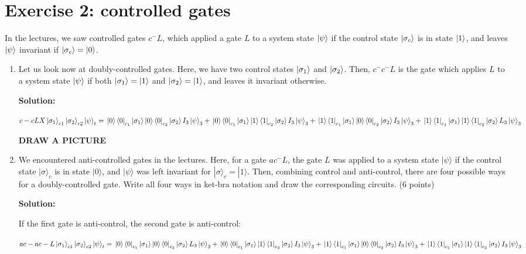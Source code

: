 \documentclass[12pt]{article}
\begin{document}
\section{Exercise 2: controlled gates}
In the lectures, we saw controlled gates $c^{-}L$, which applied a gate $L$ to a system state $\ket{\psi}$ if the control state $\ket{\sigma_c}$ is in state $\ket{1}$, and leaves $\ket{\psi}$ invariant if $\ket{\sigma_c} = \ket{0}$.
\begin{enumerate}
    \item Let us look now at doubly-controlled gates. Here, we have two control states $\ket{\sigma_1}$ and $\ket{\sigma_2}$. Then, $c^{-}c^{-}L$ is the gate which applies $L$ to a system state $\ket{\psi}$ if both $\ket{\sigma_1}=\ket{1}$ and $\ket{\sigma_2}=\ket{1}$, and leaves it invariant otherwise.


          \textbf{Solution:}


          $
              c-cLX\ket{\sigma_1}_{c1}\ket{\sigma_2}_{c2}\ket{\psi}_t=
              \\\ket{0}\bra{0}_{c_1}\ket{\sigma_1}\ket{0}\bra{0}_{c_2}\ket{\sigma_2}I_3\ket{\psi}_3+
              \\\ket{0}\bra{0}_{c_1}\ket{\sigma_1}\ket{1}\bra{1}_{c_2}\ket{\sigma_2}I_3\ket{\psi}_3+
              \\\ket{1}\bra{1}_{c_1}\ket{\sigma_1}\ket{0}\bra{0}_{c_2}\ket{\sigma_2}I_3\ket{\psi}_3+
              \\\ket{1}\bra{1}_{c_1}\ket{\sigma_1}\ket{1}\bra{1}_{c_2}\ket{\sigma_2}L_3\ket{\psi}_3
          $


          \textbf{DRAW A PICTURE}

    \item We encountered anti-controlled gates in the lectures. Here, for a gate $ac^{-}L$, the gate $L$ was applied to a system state $|\psi\rangle$ if the control state $|\sigma\rangle_c$ is in state $|0\rangle$, and $|\psi\rangle$ was left invariant for $|\sigma\rangle_c = |1\rangle$. Then, combining control and anti-control, there are four possible ways for a doubly-controlled gate. Write all four ways in ket-bra notation and draw the corresponding circuits. (6 points)

          \textbf{Solution:}

          If the first gate is anti-control, the second gate is anti-control:

          $
              ac-ac-L\ket{\sigma_1}_{c1}\ket{\sigma_2}_{c2}\ket{\psi}_t=
              \\\ket{0}\bra{0}_{c_1}\ket{\sigma_1}\ket{0}\bra{0}_{c_2}\ket{\sigma_2}L_3\ket{\psi}_3+
              \\\ket{0}\bra{0}_{c_1}\ket{\sigma_1}\ket{1}\bra{1}_{c_2}\ket{\sigma_2}I_3\ket{\psi}_3+
              \\\ket{1}\bra{1}_{c_1}\ket{\sigma_1}\ket{0}\bra{0}_{c_2}\ket{\sigma_2}I_3\ket{\psi}_3+
              \\\ket{1}\bra{1}_{c_1}\ket{\sigma_1}\ket{1}\bra{1}_{c_2}\ket{\sigma_2}I_3\ket{\psi}_3
          $


\end{enumerate}
\end{document}
